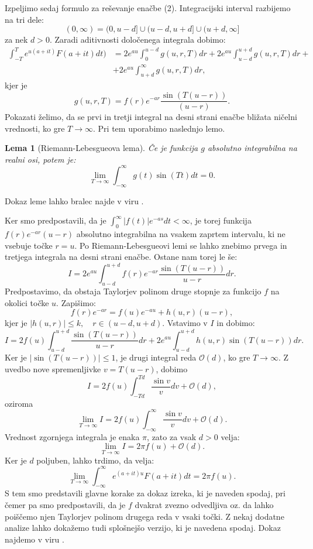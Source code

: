 \documentclass[12pt,a4paper]{amsart}
\theoremstyle{definition} %
\theoremstyle{plain} %
\newtheorem{lema}[definicija]{Lema}
\begin{document}
Izpeljimo sedaj formulo za reševanje enačbe (2). Integracijski interval razbijemo na tri 
dele: $$(0,\infty) = (0,u-d] \cup (u-d,u+d] \cup (u+d,\infty]$$ za nek $d>0$. Zaradi aditivnosti določenega
integrala dobimo:
\begin{equation*}
    \begin{split}
        \int_{-T}^{T}e^{u(a+it)}F(a+it)dt) &= 2e^{au}\int_0^{u-d}g(u,r,T)dr +
        2e^{au}\int_{u-d}^{u+d}g(u,r,T)dr+ \\
        &+ 2e^{au}\int_{u+d}^{\infty}g(u,r,T)dr,
    \end{split}
\end{equation*}
kjer je $$g(u,r,T)=f(r)e^{-ar}\frac{\sin(T(u-r))}{(u-r)}.$$ Pokazati želimo, da se prvi in tretji integral
na desni strani enačbe bližata ničelni vrednosti, ko gre $T\to\infty$. Pri tem uporabimo naslednjo lemo.
\begin{lema}[Riemann-Lebesgueova lema]
    Če je funkcija $g$ absolutno integrabilna na realni osi, potem je:
    \[\lim_{T\to\infty}\int_{-\infty}^{\infty}g(t)\sin(Tt)dt=0.\]
\end{lema}
\noindent Dokaz leme lahko bralec najde v viru \cite{dokazleme}.

Ker smo predpostavili, da je $\int_0^{\infty}|f(t)|e^{-as}dt<\infty$, je torej funkcija 
$f(r)e^{-ar}(u-r)$ absolutno integrabilna na vsakem zaprtem intervalu, ki ne vsebuje točke $r=u$. Po 
Riemann-Lebesgueovi lemi se lahko znebimo prvega in tretjega integrala na desni strani enačbe. Ostane
nam torej le še:
\[I = 2e^{au}\int_{u-d}^{u+d}f(r)e^{-ar}\frac{\sin(T(u-r))}{u-r}dr.\]
Predpostavimo, da obstaja Taylorjev polinom druge stopnje za funkcijo $f$ na okolici točke $u$.
Zapišimo:
\[f(r)e^{-ar}=f(u)e^{-au}+h(u,r)(u-r),\]
kjer je $|h(u,r)|\leq k, \quad r\in(u-d,u+d).$
Vstavimo v $I$ in dobimo:
\[I = 2f(u)\int_{u-d}^{u+d}\frac{\sin(T(u-r))}{u-r}dr+2e^{au}\int_{u-d}^{u+d}h(u,r)\sin(T(u-r))dr.\]
Ker je $|\sin(T(u-r))|\leq1$, je drugi integral reda $\mathcal{O}(d)$, ko gre $T\to\infty$. Z uvedbo 
nove spremenljivke $v=T(u-r)$, dobimo
\[I=2f(u)\int_{-Td}^{Td}\frac{\sin v}{v}dv +\mathcal{O}(d),\]
oziroma
\[\lim_{T\to\infty}I=2f(u)\int_{-\infty}^{\infty}\frac{\sin v}{v}dv +\mathcal{O}(d).\]
Vrednost zgornjega integrala je enaka $\pi$, zato za vsak $d>0$ velja:
\[\lim_{T\to\infty}I=2\pi f(u)+\mathcal{O}(d).\]
Ker je $d$ poljuben, lahko trdimo, da velja:
\[\lim_{T\to\infty}\int_{-\infty}^{\infty}e^{(a+it)u}F(a+it)dt=2\pi f(u).\]
S tem smo predstavili glavne korake za dokaz izreka, ki je naveden spodaj, pri čemer pa 
smo predpostavili, da je $f$ dvakrat zvezno odvedljiva oz. da lahko poiščemo njen Taylorjev polinom drugega
reda v vsaki točki. 
Z nekaj dodatne analize lahko dokažemo tudi splošnejšo verzijo, ki je navedena spodaj. Dokaz najdemo v viru \cite{knjiga}.
\end{document}
